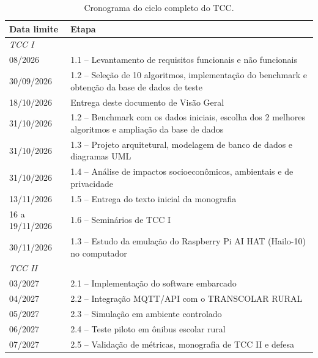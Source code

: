 \documentclass[
    12pt,
    oneside,
    a4paper,
    article,
    english,
    brazil
    ]{abntex2}
\begin{document}
\begin{table}[H]
\centering
\caption{Cronograma do ciclo completo do TCC.}
\label{tab:cronograma}
\begin{tabularx}{\textwidth}{lX}
    \toprule
    \textbf{Data limite} & \textbf{Etapa} \\
    \midrule
    \multicolumn{2}{l}{\textit{TCC I}} \\
    08/2026     & 1.1 -- Levantamento de requisitos funcionais e não funcionais \\
    30/09/2026  & 1.2 -- Seleção de 10 algoritmos, implementação do benchmark e obtenção da base de dados de teste \\
    18/10/2026  & Entrega deste documento de Visão Geral \\
    31/10/2026  & 1.2 -- Benchmark com os dados iniciais, escolha dos 2 melhores algoritmos e ampliação da base de dados \\
    31/10/2026  & 1.3 -- Projeto arquitetural, modelagem de banco de dados e diagramas UML \\
    31/10/2026  & 1.4 -- Análise de impactos socioeconômicos, ambientais e de privacidade \\
    13/11/2026  & 1.5 -- Entrega do texto inicial da monografia \\
    16 a 19/11/2026 & 1.6 -- Seminários de TCC I \\
    30/11/2026  & 1.3 -- Estudo da emulação do Raspberry Pi AI HAT (Hailo-10) no computador \\
    \midrule
    \multicolumn{2}{l}{\textit{TCC II}} \\
    03/2027     & 2.1 -- Implementação do software embarcado \\
    04/2027     & 2.2 -- Integração MQTT/API com o TRANSCOLAR RURAL \\
    05/2027     & 2.3 -- Simulação em ambiente controlado \\
    06/2027     & 2.4 -- Teste piloto em ônibus escolar rural \\
    07/2027     & 2.5 -- Validação de métricas, monografia de TCC II e defesa \\
    \bottomrule
\end{tabularx}
\end{table}


\end{document}
